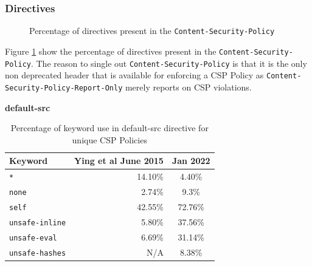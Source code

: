 \documentclass{mscreport}
\begin{document}
\clearpage
\newpage

\subsubsection{Directives}

\begin{figure}[H]
	\begin{center}
		\caption{Percentage of directives present in the \texttt{Content-Security-Policy}}
		\label{fig:csp_csp_by_directives}
	\end{center}
\end{figure}

Figure \ref{fig:csp_csp_by_directives} show the percentage of directives present in the \texttt{Content-Security-Policy}. The reason to single out \texttt{Content-Security-Policy} is that it is the only non deprecated header that is available for enforcing a CSP Policy as \texttt{Content-Security-Policy-Report-Only} merely reports on CSP violations.

\vspace{0.7cm} \noindent
\textbf{default-src}

\begin{table}[H]
  \begin{center}
    \begin{tabular}{|l|D|c|}  %
      \hline
      \textbf{Keyword} & \textbf{Ying et al} \cite{Ying2016-ag} June 2015 & Jan 2022 \\
      \hline
      \texttt{*} & 14.10\% & 4.40\%\\
      \hline
      \texttt{none} & 2.74\% & 9.3\%\\
      \hline
      \texttt{self} & 42.55\% & 72.76\%\\
      \hline
      \texttt{unsafe-inline} & 5.80\% & 37.56\%\\
      \hline
      \texttt{unsafe-eval} & 6.69\% & 31.14\%\\
      \hline
      \texttt{unsafe-hashes} & N/A & 8.38\%\\
      \hline
    \end{tabular}
    \caption{Percentage of keyword use in default-src directive for unique CSP Policies}
    \label{table:csp_default-src-keyword} %
  \end{center}
\end{table}
\end{document}
